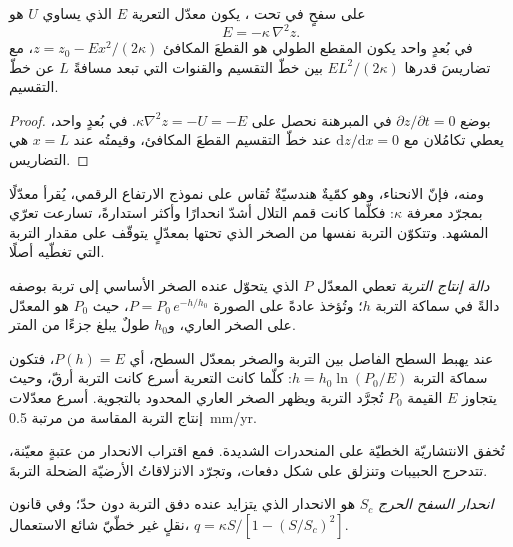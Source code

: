 \begin{proposition}\label{prop:b3:quantitative-geomorphology:curvature}
على سفحٍ في  تحت ، يكون معدّل التعرية
$E$ الذي يساوي $U$ هو
\[
E = -\kappa\,\nabla^2 z .
\]
في بُعدٍ واحد يكون المقطع الطولي هو القطعَ المكافئ $z = z_0 - E x^2/(2\kappa)$،
مع تضاريسَ قدرها $E L^2/(2\kappa)$ بين خطّ التقسيم والقنوات التي تبعد مسافةً
$L$ عن خطّ التقسيم.
\end{proposition}

\begin{proof}
بوضع $\partial z/\partial t = 0$ في المبرهنة نحصل على $\kappa\nabla^2 z =
-U = -E$. في بُعدٍ واحد، يعطي تكامُلان مع $\mathrm{d}z/\mathrm{d}x =
0$ عند خطّ التقسيم القطعَ المكافئ، وقيمتُه عند $x = L$ هي التضاريس.
\end{proof}

ومنه، فإنّ الانحناء، وهو كمّيةٌ هندسيّةٌ تُقاس على نموذج الارتفاع الرقمي،
يُقرأ معدّلًا بمجرّد معرفة $\kappa$: فكلّما كانت قمم التلال أشدّ انحدارًا وأكثر استدارةً،
تسارعت تعرّي المشهد. وتتكوّن التربة نفسها من الصخر الذي تحتها
بمعدّلٍ يتوقّف على مقدار التربة التي تغطّيه أصلًا.

\begin{definition}\label{def:b3:quantitative-geomorphology:soil-production}
\emph{دالة إنتاج التربة} تعطي
المعدّل $P$ الذي يتحوّل عنده الصخر الأساسي إلى تربة بوصفه دالةً في سماكة التربة
$h$؛ وتُؤخذ عادةً على الصورة $P = P_0\,e^{-h/h_0}$، حيث
$P_0$ هو المعدّل على الصخر العاري، و$h_0$ طولٌ يبلغ جزءًا من المتر.
\end{definition}

عند  يهبط السطح الفاصل بين التربة والصخر بمعدّل
السطح، أي $P(h) = E$، فتكون سماكة التربة $h = h_0 \ln(P_0/E)$: كلّما كانت التعرية أسرع كانت التربة أرقّ،
وحيث يتجاوز $E$ القيمة $P_0$ تُجرَّد التربة
ويظهر الصخر العاري المحدود بالتجوية. أسرع معدّلات إنتاج التربة
المقاسة من مرتبة \qty{0.5}{mm/yr}.

تُخفق الانتشاريّة الخطيّة على المنحدرات الشديدة. فمع اقتراب الانحدار من
عتبةٍ معيّنة، تتدحرج الحبيبات وتنزلق على شكل دفعات، وتجرّد الانزلاقاتُ الأرضيّة الضحلة
التربةَ.

\begin{definition}\label{def:b3:quantitative-geomorphology:critical}
\emph{انحدار السفح الحرج}
$S_c$ هو الانحدار الذي يتزايد عنده دفق التربة دون حدّ؛ وفي
قانون نقلٍ غير خطّيّ شائع الاستعمال، $q = \kappa S/[1 - (S/S_c)^2]$.
\end{definition}

